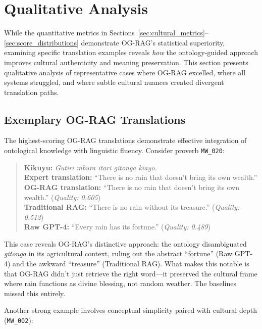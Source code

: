 \section{Qualitative Analysis}
\label{sec:qualitative_analysis}

While the quantitative metrics in Sections~\ref{sec:cultural_metrics}--\ref{sec:score_distributions} demonstrate OG-RAG's statistical superiority, examining specific translation examples reveals \emph{how} the ontology-guided approach improves cultural authenticity and meaning preservation. This section presents qualitative analysis of representative cases where OG-RAG excelled, where all systems struggled, and where subtle cultural nuances created divergent translation paths.

\subsection{Exemplary OG-RAG Translations}
\label{subsec:exemplary_translations}

The highest-scoring OG-RAG translations demonstrate effective integration of ontological knowledge with linguistic fluency. Consider proverb \texttt{MW\_020}:

\begin{quote}
\textbf{Kikuyu:} \emph{Gutiri mbura itari gitonga kiayo.}\\
\textbf{Expert translation:} ``There is no rain that doesn't bring its own wealth.''\\
\textbf{OG-RAG translation:} ``There is no rain that doesn't bring its own wealth.'' (\textit{Quality: 0.605})\\
\textbf{Traditional RAG:} ``There is no rain without its treasure.'' (\textit{Quality: 0.512})\\
\textbf{Raw GPT-4:} ``Every rain has its fortune.'' (\textit{Quality: 0.489})
\end{quote}

This case reveals OG-RAG's distinctive approach: the ontology disambiguated \emph{gitonga} in its agricultural context, ruling out the abstract ``fortune'' (Raw GPT-4) and the awkward ``treasure'' (Traditional RAG). What makes this notable is that OG-RAG didn't just retrieve the right word—it preserved the cultural frame where rain functions as divine blessing, not random weather. The baselines missed this entirely.

Another strong example involves conceptual simplicity paired with cultural depth (\texttt{MW\_002}):

